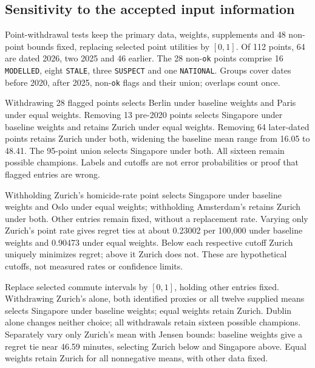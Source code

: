 \subsection{Sensitivity to the accepted input information}\label{sec:sourcepolicy}
Point-withdrawal tests keep the primary data, weights, supplements and 48
non-point bounds fixed, replacing selected point utilities by $[0,1]$.
Of 112 points, 64 are dated 2026, two 2025 and 46 earlier. The 28
non-\texttt{ok} points comprise 16 \texttt{MODELLED}, eight \texttt{STALE},
three \texttt{SUSPECT} and one \texttt{NATIONAL}. Groups cover dates before
2020, after 2025, non-\texttt{ok} flags and their union; overlaps count once.



Withdrawing 28 flagged points selects Berlin under baseline weights and Paris
under equal weights. Removing 13 pre-2020 points selects Singapore under
baseline weights and retains Zurich under equal weights. Removing 64
later-dated points retains Zurich under both, widening the baseline mean
range from 16.05 to 48.41. The 95-point union selects Singapore under both.
All sixteen remain possible champions. Labels and cutoffs are not error
probabilities or proof that flagged entries are wrong.

Withholding Zurich's homicide-rate point selects Singapore under baseline
weights and Oslo under equal weights; withholding Amsterdam's retains Zurich
under both. Other entries remain fixed, without a replacement rate.
Varying only Zurich's point rate gives regret ties at about 0.23002 per 100,000
under baseline weights and 0.90473 under equal weights. Below each respective
cutoff Zurich uniquely minimizes regret; above it Zurich does not. These are
hypothetical cutoffs, not measured rates or confidence limits.

Replace selected commute intervals by $[0,1]$, holding other entries fixed.
Withdrawing Zurich's alone, both identified proxies or all twelve supplied
means selects Singapore under baseline weights; equal weights retain Zurich.
Dublin alone changes neither choice; all withdrawals retain sixteen possible
champions. Separately vary only Zurich's mean with Jensen bounds: baseline
weights give a regret tie near 46.59 minutes, selecting Zurich below and
Singapore above. Equal weights retain Zurich for all nonnegative means,
with other data fixed.
